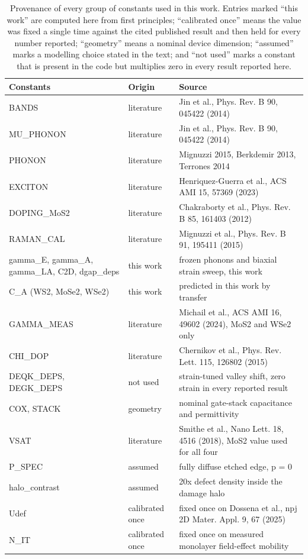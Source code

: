 \begin{table}[t]
\caption{Provenance of every group of constants used in this work.  Entries
marked ``this work'' are computed here from first principles; ``calibrated
once'' means the value was fixed a single time against the cited published
result and then held for every number reported; ``geometry'' means a nominal
device dimension; ``assumed'' marks a modelling choice stated in the text; and
``not used'' marks a constant that is present in the code but multiplies zero
in every result reported here.}
\label{tab:prov}
\begin{ruledtabular}
\begin{tabular}{@{}>{\raggedright\arraybackslash}p{} l
>{\raggedright\arraybackslash}p{}@{}}
Constants & Origin & Source \\
\hline
BANDS & literature & Jin et al., Phys. Rev. B 90, 045422 (2014) \\
MU\_PHONON & literature & Jin et al., Phys. Rev. B 90, 045422 (2014) \\
PHONON & literature & Mignuzzi 2015, Berkdemir 2013, Terrones 2014 \\
EXCITON & literature & Henriquez-Guerra et al., ACS AMI 15, 57369 (2023) \\
DOPING\_MoS2 & literature & Chakraborty et al., Phys. Rev. B 85, 161403 (2012) \\
RAMAN\_CAL & literature & Mignuzzi et al., Phys. Rev. B 91, 195411 (2015) \\
gamma\_E, gamma\_A, gamma\_LA, C2D, dgap\_deps & this work & frozen phonons and biaxial strain sweep, this work \\
C\_A (WS2, MoSe2, WSe2) & this work & predicted in this work by transfer \\
GAMMA\_MEAS & literature & Michail et al., ACS AMI 16, 49602 (2024), MoS2 and WSe2 only \\
CHI\_DOP & literature & Chernikov et al., Phys. Rev. Lett. 115, 126802 (2015) \\
DEQK\_DEPS, DEGK\_DEPS & not used & strain-tuned valley shift, zero strain in every reported result \\
COX, STACK & geometry & nominal gate-stack capacitance and permittivity \\
VSAT & literature & Smithe et al., Nano Lett. 18, 4516 (2018), MoS2 value used for all four \\
P\_SPEC & assumed & fully diffuse etched edge, p = 0 \\
halo\_contrast & assumed & 20x defect density inside the damage halo \\
Udef & calibrated once & fixed once on Dossena et al., npj 2D Mater. Appl. 9, 67 (2025) \\
N\_IT & calibrated once & fixed once on measured monolayer field-effect mobility \\
\end{tabular}
\end{ruledtabular}
\end{table}
